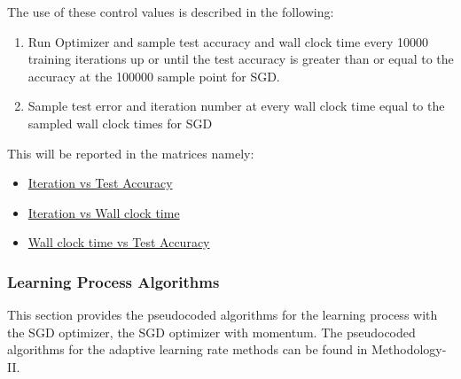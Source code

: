 \documentclass{article}
\begin{document}
The use of these control values is described in the following:

\begin{enumerate}
	\item Run Optimizer and sample test accuracy and wall clock time every 10000 training iterations up or until the test accuracy is greater than or equal to the accuracy at the 100000 sample point for SGD.
	\item Sample test error and iteration number at every wall clock time equal to the sampled wall clock times for SGD
\end{enumerate}
This will be reported in the matrices namely:
\begin{itemize}
	\item  \hyperref[sec:IvsTA]{Iteration vs Test Accuracy}
	\item \hyperref[sec:IvsWCT]{Iteration vs Wall clock time}
	\item \hyperref[sec:WCTvsTA]{Wall clock time vs Test Accuracy }
\end{itemize}

\subsubsection{Learning Process Algorithms}
This section provides the pseudocoded algorithms for the learning process with the SGD optimizer, the SGD optimizer with momentum. The pseudocoded algorithms for the adaptive learning rate methods can be found in Methodology-II.
\end{document}
